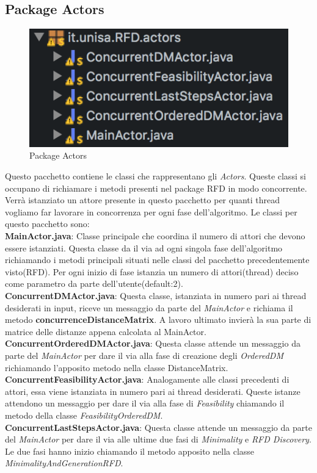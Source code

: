 \subsection{Package Actors}
\begin{figure}[H]
	\centering
	\includegraphics{Immagini/PackageActors.png}
	\caption{Package Actors}
	\label{fig:Package Actors}
\end{figure}
Questo pacchetto contiene le classi che rappresentano gli \emph{Actors}.
Queste classi si occupano di richiamare i metodi presenti nel package RFD in modo concorrente.
Verrà istanziato un attore presente in questo pacchetto per quanti thread vogliamo far lavorare in concorrenza per ogni fase dell'algoritmo.
Le classi per questo pacchetto sono:\\
\textbf{MainActor.java}:
Classe principale che coordina il numero di attori che devono essere istanziati.
Questa classe da il via ad ogni singola fase dell'algoritmo richiamando i metodi principali situati nelle classi del pacchetto precedentemente visto(RFD).
Per ogni inizio di fase istanzia un numero di attori(thread) deciso come parametro da parte dell'utente(default:2).\\
\textbf{ConcurrentDMActor.java}:
Questa classe, istanziata in numero pari ai thread desiderati in input, riceve un messaggio da parte del \emph{MainActor} e richiama il metodo \textbf{concurrenceDistanceMatrix}.
A lavoro ultimato invierà la sua parte di matrice delle distanze appena calcolata al MainActor.\\
\textbf{ConcurrentOrderedDMActor.java}:
Questa classe attende un messaggio da parte del \emph{MainActor} per dare il via alla fase di creazione degli \emph{OrderedDM} richiamando l'apposito metodo nella classe DistanceMatrix.\\
\textbf{ConcurrentFeasibilityActor.java}:
Analogamente alle classi precedenti di attori, essa viene istanziata in numero pari ai thread desiderati.
Queste istanze attendono un messaggio per dare il via alla fase di \emph{Feasibility} chiamando il metodo della classe \emph{FeasibilityOrderedDM}.\\
\textbf{ConcurrentLastStepsActor.java}:
Questa classe attende un messaggio da parte del \emph{MainActor} per dare il via alle ultime due fasi di \emph{Minimality} e \emph{RFD Discovery}.
Le due fasi hanno inizio chiamando il metodo apposito nella classe \emph{MinimalityAndGenerationRFD}.
